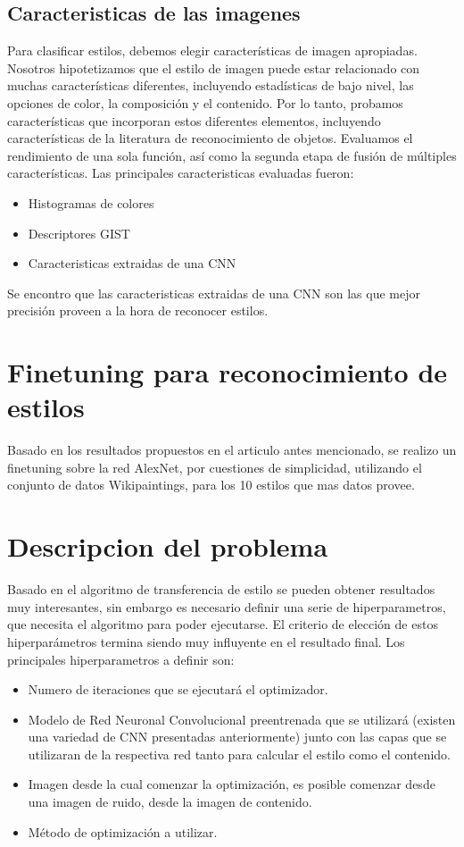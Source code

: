 \documentclass[a4paper,12pt,spanish]{book}
\begin{document}
    \subsection{Caracteristicas de las imagenes}
	Para clasificar estilos, debemos elegir características de imagen apropiadas. Nosotros hipotetizamos que el estilo de imagen puede estar relacionado con muchas características diferentes, 
	incluyendo estadísticas de bajo nivel, las opciones de color, la composición y el contenido. Por lo tanto, probamos características que incorporan estos diferentes elementos, incluyendo características de la 
	literatura de reconocimiento de objetos. Evaluamos el rendimiento de una sola función, así como la segunda etapa de fusión de múltiples características.
	Las principales caracteristicas evaluadas fueron:
	\begin{itemize}
	 \item Histogramas de colores
	 \item Descriptores GIST
	 \item Caracteristicas extraidas de una CNN
	\end{itemize}
	Se encontro que las caracteristicas extraidas de una CNN son las que mejor precisión proveen a la hora de reconocer estilos.

  \section{Finetuning para reconocimiento de estilos}
    Basado en los resultados propuestos en el articulo antes mencionado, se realizo un finetuning sobre la red AlexNet, por cuestiones de simplicidad, utilizando
    el conjunto de datos Wikipaintings, para los 10 estilos que mas datos provee.

    
  \section{Descripcion del problema}
    Basado en el algoritmo de transferencia de estilo se pueden obtener resultados muy interesantes, sin embargo es necesario definir una serie de hiperparametros,
    que necesita el algoritmo para poder ejecutarse. El criterio de elección de estos hiperparámetros termina siendo muy influyente en el resultado final. 
    Los principales hiperparametros a definir son:
    \begin{itemize}
      \item Numero de iteraciones que se ejecutará el optimizador.
      \item Modelo de Red Neuronal Convolucional preentrenada que se utilizará (existen una variedad de CNN presentadas anteriormente) junto con las capas que se utilizaran de la 
      respectiva red tanto para calcular el estilo como el contenido.
      \item Imagen desde la cual comenzar la optimización, es posible comenzar desde una imagen de ruido, desde la imagen de contenido.
      \item Método de optimización a utilizar.
    \end{itemize}
\end{document}
